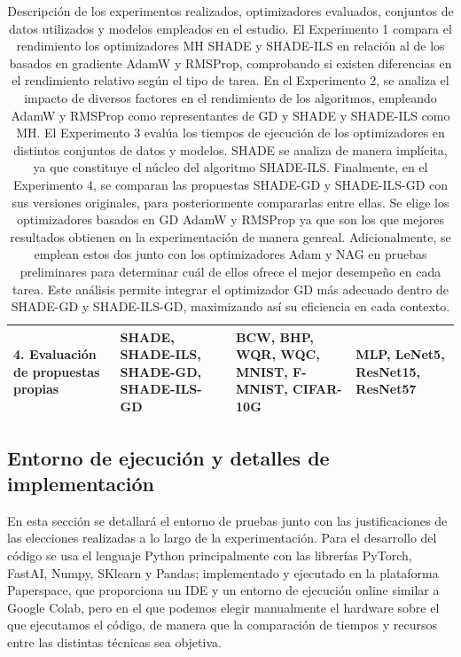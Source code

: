 \begin{table}[H]
{\begin{tabular}{|p{3.5cm}|p{3.5cm}|p{4.5cm}|p{3.5cm}|}
4. Evaluación de propuestas propias & 
\raggedright SHADE, SHADE-ILS, SHADE-GD, SHADE-ILS-GD & 
\raggedright BCW, BHP, WQR, WQC, MNIST, F-MNIST, CIFAR-10G & 
MLP, LeNet5, ResNet15, ResNet57 \\ \hline
\end{tabular}}
\caption[Descripción de los experimentos realizados, optimizadores evaluados, conjuntos de datos utilizados y modelos empleados en el estudio]{Descripción de los experimentos realizados, optimizadores evaluados, conjuntos de datos utilizados y modelos empleados en el estudio. El Experimento 1 compara el rendimiento los optimizadores MH SHADE y SHADE-ILS en relación al de los basados en gradiente AdamW y RMSProp, comprobando si existen diferencias en el rendimiento relativo según el tipo de tarea. En el Experimento 2, se analiza el impacto de diversos factores en el rendimiento de los algoritmos, empleando AdamW y RMSProp como representantes de GD y SHADE y SHADE-ILS como MH. El Experimento 3 evalúa los tiempos de ejecución de los optimizadores en distintos conjuntos de datos y modelos. SHADE se analiza de manera implícita, ya que constituye el núcleo del algoritmo SHADE-ILS. Finalmente, en el Experimento 4, se comparan las propuestas SHADE-GD y SHADE-ILS-GD con sus versiones originales, para posteriormente compararlas entre ellas. Se elige los optimizadores basados en GD AdamW y RMSProp ya que son los que mejores resultados obtienen en la experimentación de manera genreal. Adicionalmente, se emplean estos dos junto con los optimizadores Adam y NAG en pruebas preliminares para determinar cuál de ellos ofrece el mejor desempeño en cada tarea. Este análisis permite integrar el optimizador GD más adecuado dentro de SHADE-GD y SHADE-ILS-GD, maximizando así su eficiencia en cada contexto.}
\label{tab:res_exp}
\end{table}


\subsection{Entorno de ejecución y detalles de implementación}

En esta sección se detallará el entorno de pruebas junto con las justificaciones de las elecciones realizadas a lo largo de la experimentación. Para el desarrollo del código se usa el lenguaje Python principalmente con las librerías PyTorch, FastAI, Numpy, SKlearn y Pandas; implementado y ejecutado en la plataforma Paperspace, que proporciona un IDE y un entorno de ejecución online similar a Google Colab, pero en el que podemos elegir manualmente el hardware sobre el que ejecutamos el código, de manera que la comparación de tiempos y recursos entre las distintas técnicas sea objetiva. 

